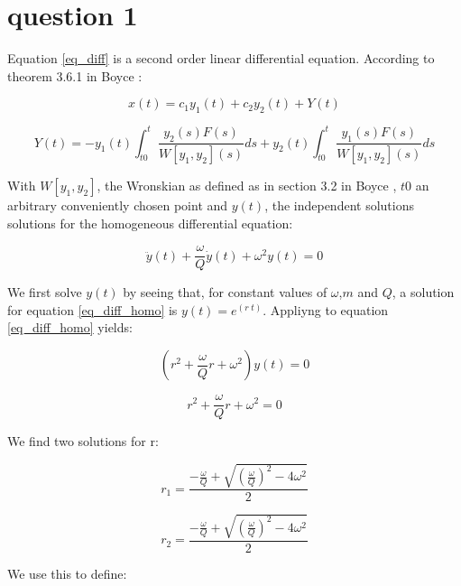 \section{question 1}

Equation \ref{eq_diff} is a second order linear differential equation. According to theorem 3.6.1 in Boyce \cite{Boyce}:

\begin{equation}
	x(t) = c_1 y_1(t) + c_2 y_2(t) + Y(t)
\end{equation}

\begin{equation}
	\label{eq_particular}
	Y(t) = - y_1(t)\int_{t0}^t \frac{y_2(s) F(s)}{W[y_1,y_2](s)}ds + y_2(t)\int_{t0}^t \frac{y_1(s) F(s)}{W[y_1,y_2](s)}ds
\end{equation}

With $W[y_1,y_2]$, the Wronskian as defined as in section 3.2 in Boyce \cite{boyce}, $t0$ an arbitrary conveniently chosen point  and $y(t)$, the independent solutions solutions for the homogeneous differential equation:

\begin{equation}
	\label{eq_diff_homo}
	\ddot{y}(t) + \frac{\omega}{Q} \dot{y}(t) + \omega^2 y(t) = 0
\end{equation}

We first solve $y(t)$ by seeing that, for constant values of $\omega$,$m$ and $Q$, a solution for equation \ref{eq_diff_homo} is  $y(t) = e^(r \; t)$. Appliyng to equation \ref{eq_diff_homo} yields:

\begin{equation}
	\label{eq_characteristic}
	(r^2 + \frac{\omega}{Q} r + \omega^2) y(t) = 0
\end{equation}

\begin{equation*}
	r^2 + \frac{\omega}{Q} r + \omega^2 = 0
\end{equation*}

We find two solutions for r:

\begin{equation*}
	r_1 = \frac{-\frac{\omega}{Q} + \sqrt{\left( \frac{\omega}{Q} \right)^2 -4 \omega^2}}{2}
\end{equation*}

\begin{equation*}
	r_2 = \frac{-\frac{\omega}{Q} + \sqrt{\left( \frac{\omega}{Q} \right)^2 -4 \omega^2}}{2}
\end{equation*}

We use this to define:

